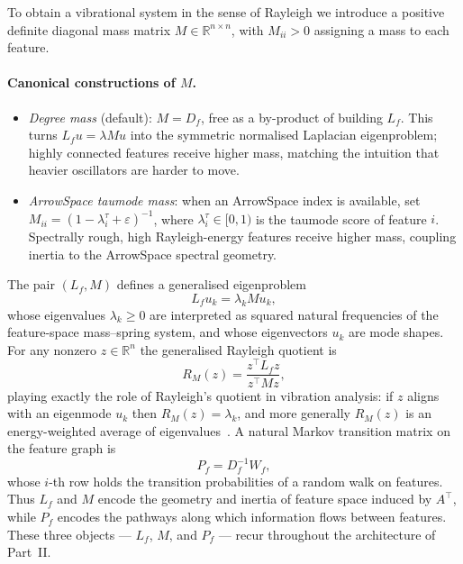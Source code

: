 \documentclass[12pt,a4paper]{article}
\theoremstyle{plain}
\theoremstyle{definition}
\theoremstyle{remark}
\newcommand{\R}{\mathbb{R}}
\newcommand{\1}{\mathbf{1}}
\begin{document}
To obtain a vibrational system in the sense of Rayleigh we introduce a
positive definite diagonal mass matrix $M \in \R^{n \times n}$, with
$M_{ii} > 0$ assigning a mass to each feature.

\paragraph{Canonical constructions of $M$.}
\begin{itemize}
\item \emph{Degree mass} (default): $M = D_f$, free as a by-product of
      building $L_f$. This turns $L_f u = \lambda M u$ into the
      symmetric normalised Laplacian eigenproblem; highly connected
      features receive higher mass, matching the intuition that heavier
      oscillators are harder to move.
\item \emph{ArrowSpace taumode mass}: when an ArrowSpace index is
      available, set $M_{ii} = (1 - \lambda_i^\tau + \varepsilon)^{-1}$,
      where $\lambda_i^\tau \in [0,1)$ is the taumode score of feature
      $i$. Spectrally rough, high Rayleigh-energy features receive higher
      mass, coupling inertia to the ArrowSpace spectral geometry.
\end{itemize}

The pair $(L_f, M)$ defines a generalised eigenproblem
\begin{equation}
    L_f u_k = \lambda_k M u_k,
    \label{eq:eigen}
\end{equation}
whose eigenvalues $\lambda_k \ge 0$ are interpreted as squared natural
frequencies of the feature-space mass--spring system, and whose
eigenvectors $u_k$ are mode shapes. For any nonzero $z \in \R^n$ the
generalised Rayleigh quotient is
\begin{equation}
    R_M(z) = \frac{z^\top L_f z}{z^\top M z},
    \label{eq:rayleigh}
\end{equation}
playing exactly the role of Rayleigh's quotient in vibration analysis:
if $z$ aligns with an eigenmode $u_k$ then $R_M(z) = \lambda_k$, and more
generally $R_M(z)$ is an energy-weighted average of
eigenvalues~\cite{osher_lsgd_2022}. A natural Markov transition matrix on
the feature graph is
\begin{equation}
    P_f = D_f^{-1} W_f,
    \label{eq:markov}
\end{equation}
whose $i$-th row holds the transition probabilities of a random walk on
features. Thus $L_f$ and $M$ encode the geometry and inertia of feature
space induced by $A^\top$, while $P_f$ encodes the pathways along which
information flows between features. These three objects ---
$L_f$, $M$, and $P_f$ --- recur throughout the architecture of
Part~II.
\end{document}

